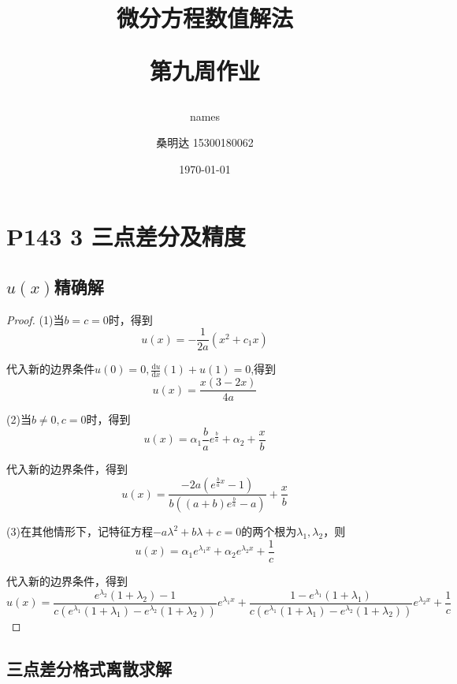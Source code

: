 \documentclass{article}%
\author{names}
\title{\heiti 微分方程数值解法\\ [2ex] \begin{large} 第九周作业 \end{large}}
\author{\kaishu 桑明达 15300180062}
\date{\today}
\begin{document}
\maketitle


\section{P143 3 三点差分及精度}

\subsection{$u(x)$精确解}
\begin{proof}
	(1)当$b=c=0$时，得到$$ u\left ( x \right )=-\frac{1}{2a}\left ( x^{2}+c_1x \right ) $$

	代入新的边界条件$ u\left ( 0 \right )=0,\frac{\mathrm{d}u}{\mathrm{d}x}\left ( 1 \right )+u\left ( 1 \right )=0 $,得到$$ u\left ( x \right )=\frac{x\left ( 3-2x \right )}{4a} $$

	(2)当$b\neq 0,c=0$时，得到$$ u\left ( x \right )=\alpha _1\frac{b}{a}e^{\frac{b}{a}}+\alpha _2+\frac{x}{b} $$

	代入新的边界条件，得到$$ u\left ( x \right )=\frac{-2a\left ( e^{\frac{b}{a}x}-1 \right )}{b\left (\left ( a+b \right )e^{\frac{b}{a}}-a  \right )}+\frac{x}{b} $$

	(3)在其他情形下，记特征方程$ -a\lambda ^2+b\lambda+c=0 $的两个根为$ \lambda_1,\lambda_2 $，则$$ u\left ( x \right )=\alpha_1e^{\lambda_1x}+\alpha_2e^{\lambda_2x}+\frac{1}{c} $$

	代入新的边界条件，得到$$ u\left ( x \right )=\frac{e^{\lambda_2}\left ( 1+\lambda_2 \right )-1}{c\left ( e^{\lambda_1}\left ( 1+\lambda_1 \right )-e^{\lambda_2}\left ( 1+\lambda_2 \right ) \right )}e^{\lambda_1x}+\frac{1-e^{\lambda_1}\left ( 1+\lambda_1 \right )}{c\left ( e^{\lambda_1}\left ( 1+\lambda_1 \right )-e^{\lambda_2}\left ( 1+\lambda_2 \right ) \right )}e^{\lambda_2x}+\frac{1}{c} $$

\end{proof}

\subsection{三点差分格式离散求解}
\end{document}
